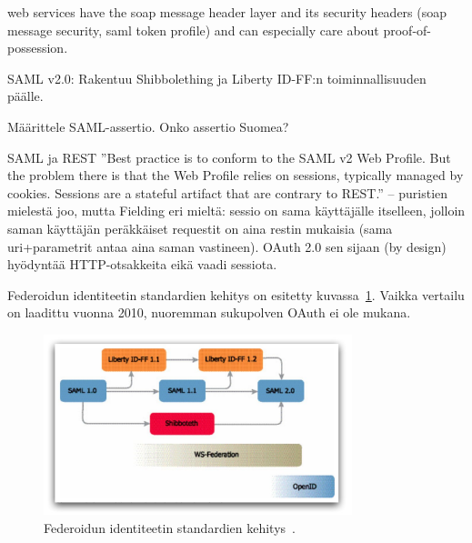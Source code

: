 \documentclass[finnish,gradu]{tktltiki}
\begin{document}
  web services have the soap message header layer and its security headers (soap message security, saml token profile) and can especially care about proof-of-possession.



  SAML v2.0: Rakentuu Shibbolething ja Liberty ID-FF:n toiminnallisuuden päälle.

  Määrittele SAML-assertio. Onko assertio Suomea?

  SAML ja REST %
  ''Best practice is to conform to the SAML v2 Web Profile. But the problem there is that the Web Profile relies on sessions, typically managed by cookies. Sessions are a stateful artifact that are contrary to REST.'' -- puristien mielestä joo, mutta Fielding eri mieltä: sessio on sama käyttäjälle itselleen, jolloin saman käyttäjän peräkkäiset requestit on aina restin mukaisia (sama uri+parametrit antaa aina saman vastineen).
  OAuth 2.0 sen sijaan (by design) hyödyntää HTTP-otsakkeita eikä vaadi sessiota.

  Federoidun identiteetin standardien kehitys on esitetty kuvassa~\ref{fig:federoidun_id_standardien_kehitys}. Vaikka vertailu on laadittu vuonna 2010, nuoremman sukupolven OAuth ei ole mukana.

  \begin{figure}
    \centering
    \includegraphics[width=0.8\textwidth]{images/federoidun_id_standardien_kehitys.jpg}
    \caption{Federoidun identiteetin standardien kehitys~\cite{ping_identity_primer_federated_id_2010}.}
    \label{fig:federoidun_id_standardien_kehitys}
  \end{figure}
\end{document}
